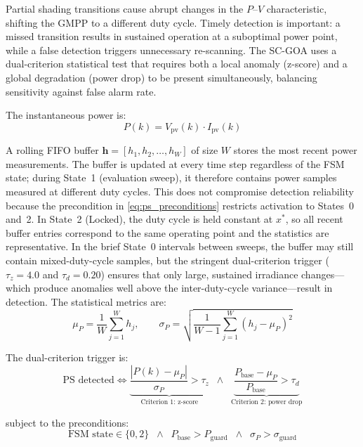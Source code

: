 \documentclass[a4paper, 12pt]{article}
\begin{document}
Partial shading transitions cause abrupt changes in the $P$--$V$ characteristic, shifting the GMPP to a different duty cycle. Timely detection is important: a missed transition results in sustained operation at a suboptimal power point, while a false detection triggers unnecessary re-scanning. The SC-GOA uses a dual-criterion statistical test that requires both a local anomaly (z-score) and a global degradation (power drop) to be present simultaneously, balancing sensitivity against false alarm rate.

The instantaneous power is:
\begin{equation}
    P(k) = V_{\mathrm{pv}}(k) \cdot I_{\mathrm{pv}}(k)
    \label{eq:power_instant}
\end{equation}

A rolling FIFO buffer $\mathbf{h} = [h_1, h_2, \ldots, h_W]$ of size $W$ stores the most recent power measurements. The buffer is updated at every time step regardless of the FSM state; during State~1 (evaluation sweep), it therefore contains power samples measured at different duty cycles. This does not compromise detection reliability because the precondition in \cref{eq:ps_preconditions} restricts activation to States~0 and~2. In State~2 (Locked), the duty cycle is held constant at $x^{*}$, so all recent buffer entries correspond to the same operating point and the statistics are representative. In the brief State~0 intervals between sweeps, the buffer may still contain mixed-duty-cycle samples, but the stringent dual-criterion trigger ($\tau_z = 4.0$ and $\tau_d = 0.20$) ensures that only large, sustained irradiance changes---which produce anomalies well above the inter-duty-cycle variance---result in detection. The statistical metrics are:
\begin{equation}
    \mu_P = \frac{1}{W} \sum_{j=1}^{W} h_j, \qquad
    \sigma_P = \sqrt{\frac{1}{W-1} \sum_{j=1}^{W} (h_j - \mu_P)^2}
    \label{eq:ps_stats}
\end{equation}

The dual-criterion trigger is:
\begin{equation}
    \text{PS detected} \iff
    \underbrace{\frac{|P(k) - \mu_P|}{\sigma_P} > \tau_z}_{\text{Criterion 1: z-score}}
    \;\;\wedge\;\;
    \underbrace{\frac{P_{\mathrm{base}} - \mu_P}{P_{\mathrm{base}}} > \tau_d}_{\text{Criterion 2: power drop}}
    \label{eq:ps_trigger}
\end{equation}

subject to the preconditions:
\begin{equation}
    \text{FSM state} \in \{0, 2\} \;\;\wedge\;\; P_{\mathrm{base}} > P_{\mathrm{guard}} \;\;\wedge\;\; \sigma_P > \sigma_{\mathrm{guard}}
    \label{eq:ps_preconditions}
\end{equation}
\end{document}
